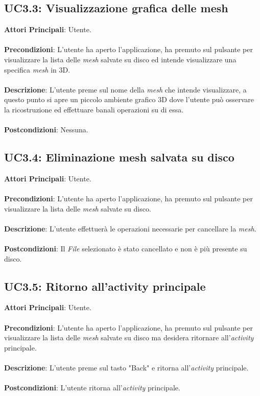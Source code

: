\subsection{UC3.3: Visualizzazione grafica delle mesh}
\textbf{Attori Principali}: Utente.
\\\\ \textbf{Precondizioni}: L'utente ha aperto l'applicazione, ha premuto sul pulsante per visualizzare la lista delle \emph{mesh} salvate su disco ed intende visualizzare una specifica \emph{mesh} in 3D.
\\\\ \textbf{Descrizione}: L'utente preme sul nome della \emph{mesh} che intende visualizzare, a questo punto si apre un piccolo ambiente grafico 3D dove l'utente può osservare la ricostruzione ed effettuare banali operazioni su di essa.
\\\\ \textbf{Postcondizioni}: Nessuna.

\subsection{UC3.4: Eliminazione mesh salvata su disco}
\textbf{Attori Principali}: Utente.
\\\\ \textbf{Precondizioni}: L'utente ha aperto l'applicazione, ha premuto sul pulsante per visualizzare la lista delle \emph{mesh} salvate su disco.
\\\\ \textbf{Descrizione}: L'utente effettuerà le operazioni necessarie per cancellare la \emph{mesh}.
\\\\ \textbf{Postcondizioni}: Il \emph{File} selezionato è stato cancellato e non è più presente su disco.

\subsection{UC3.5: Ritorno all'activity principale}
\textbf{Attori Principali}: Utente.
\\\\ \textbf{Precondizioni}: L'utente ha aperto l'applicazione, ha premuto sul pulsante per visualizzare la lista delle \emph{mesh} salvate su disco ma desidera ritornare all'\emph{activity} principale.
\\\\ \textbf{Descrizione}: L'utente preme sul tasto "Back" e ritorna all'\emph{activity} principale.
\\\\ \textbf{Postcondizioni}: L'utente ritorna all'\emph{activity} principale.


